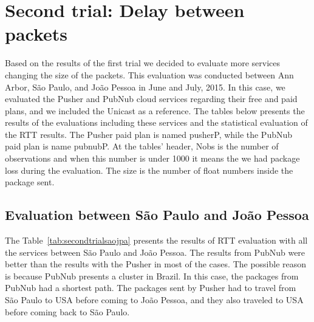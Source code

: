 \section{Second trial: Delay between packets}

Based on the results of the first trial we decided to evaluate more services changing the size of the packets.
This evaluation was conducted between Ann Arbor, São Paulo, and João Pessoa in June and July, 2015.
In this case, we evaluated the Pusher and PubNub cloud services regarding their free and paid plans, and we included the Unicast as a reference.
The tables below presents the results of the evaluations including these services and the statistical evaluation of the RTT results.
The Pusher paid plan is named pusherP, while the PubNub paid plan is name pubnubP.
At the tables' header, Nobs is the number of observations and when this number is under 1000 it means the we had package loss during the evaluation.
The size is the number of float numbers inside the package sent.


\subsection*{Evaluation between São Paulo and João Pessoa} 

The Table~\ref{tab:secondtrialsaojpa} presents the results of RTT evaluation with all the services between São Paulo and João Pessoa.
The results from PubNub were better than the results with the Pusher in most of the cases.
The possible reason is because PubNub presents a cluster in Brazil.
In this case, the packages from PubNub had a shortest path.
The packages sent by Pusher had to travel from São Paulo to USA before coming to João Pessoa, and they also traveled to USA before coming back to São Paulo.

